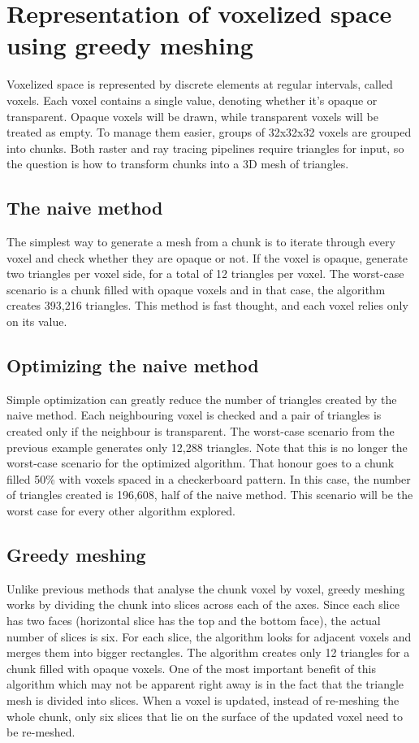 \documentclass[times, utf8, zavrsni, numeric]{fer}
\begin{document}
\chapter{Representation of voxelized space using greedy meshing}
Voxelized space is represented by discrete elements at regular intervals, called voxels. Each voxel contains a single value, denoting whether it's opaque or transparent. Opaque voxels will be drawn, while transparent voxels will be treated as empty. To manage them easier, groups of 32x32x32 voxels are grouped into chunks. Both raster and ray tracing pipelines require triangles for input, so the question is how to transform chunks into a 3D mesh of triangles.

\section{The naive method}
The simplest way to generate a mesh from a chunk is to iterate through every voxel and check whether they are opaque or not. If the voxel is opaque, generate two triangles per voxel side, for a total of 12 triangles per voxel. The worst-case scenario is a chunk filled with opaque voxels and in that case, the algorithm creates 393,216 triangles. This method is fast thought, and each voxel relies only on its value.

\section{Optimizing the naive method}
Simple optimization can greatly reduce the number of triangles created by the naive method. Each neighbouring voxel is checked and a pair of triangles is created only if the neighbour is transparent. The worst-case scenario from the previous example generates only 12,288 triangles. Note that this is no longer the worst-case scenario for the optimized algorithm. That honour goes to a chunk filled 50\% with voxels spaced in a checkerboard pattern. In this case, the number of triangles created is 196,608, half of the naive method. This scenario will be the worst case for every other algorithm explored.

\section{Greedy meshing}
Unlike previous methods that analyse the chunk voxel by voxel, greedy meshing works by dividing the chunk into slices across each of the axes. Since each slice has two faces (horizontal slice has the top and the bottom face), the actual number of slices is six.
For each slice, the algorithm looks for adjacent voxels and merges them into bigger rectangles. The algorithm creates only 12 triangles for a chunk filled with opaque voxels. One of the most important benefit of this algorithm which may not be apparent right away is in the fact that the triangle mesh is divided into slices. When a voxel is updated, instead of re-meshing the whole chunk, only six slices that lie on the surface of the updated voxel need to be re-meshed.
\end{document}
